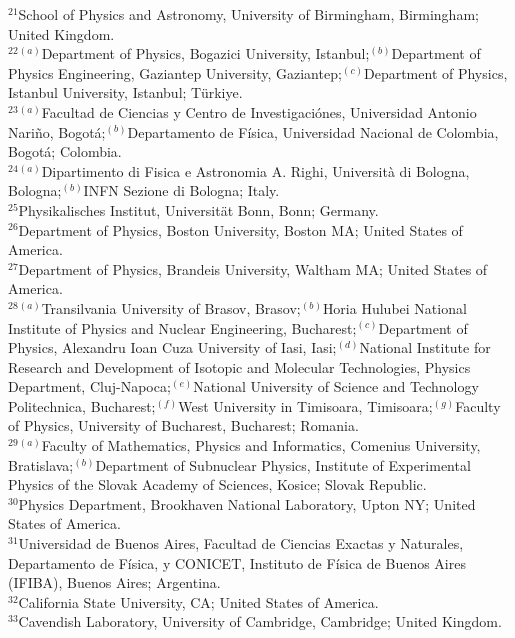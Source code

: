 \begin{flushleft}
$^{21}$School of Physics and Astronomy, University of Birmingham, Birmingham; United Kingdom.\\
$^{22}$$^{(a)}$Department of Physics, Bogazici University, Istanbul;$^{(b)}$Department of Physics Engineering, Gaziantep University, Gaziantep;$^{(c)}$Department of Physics, Istanbul University, Istanbul; T\"urkiye.\\
$^{23}$$^{(a)}$Facultad de Ciencias y Centro de Investigaci\'ones, Universidad Antonio Nari\~no, Bogot\'a;$^{(b)}$Departamento de F\'isica, Universidad Nacional de Colombia, Bogot\'a; Colombia.\\
$^{24}$$^{(a)}$Dipartimento di Fisica e Astronomia A. Righi, Università di Bologna, Bologna;$^{(b)}$INFN Sezione di Bologna; Italy.\\
$^{25}$Physikalisches Institut, Universit\"{a}t Bonn, Bonn; Germany.\\
$^{26}$Department of Physics, Boston University, Boston MA; United States of America.\\
$^{27}$Department of Physics, Brandeis University, Waltham MA; United States of America.\\
$^{28}$$^{(a)}$Transilvania University of Brasov, Brasov;$^{(b)}$Horia Hulubei National Institute of Physics and Nuclear Engineering, Bucharest;$^{(c)}$Department of Physics, Alexandru Ioan Cuza University of Iasi, Iasi;$^{(d)}$National Institute for Research and Development of Isotopic and Molecular Technologies, Physics Department, Cluj-Napoca;$^{(e)}$National University of Science and Technology Politechnica, Bucharest;$^{(f)}$West University in Timisoara, Timisoara;$^{(g)}$Faculty of Physics, University of Bucharest, Bucharest; Romania.\\
$^{29}$$^{(a)}$Faculty of Mathematics, Physics and Informatics, Comenius University, Bratislava;$^{(b)}$Department of Subnuclear Physics, Institute of Experimental Physics of the Slovak Academy of Sciences, Kosice; Slovak Republic.\\
$^{30}$Physics Department, Brookhaven National Laboratory, Upton NY; United States of America.\\
$^{31}$Universidad de Buenos Aires, Facultad de Ciencias Exactas y Naturales, Departamento de F\'isica, y CONICET, Instituto de Física de Buenos Aires (IFIBA), Buenos Aires; Argentina.\\
$^{32}$California State University, CA; United States of America.\\
$^{33}$Cavendish Laboratory, University of Cambridge, Cambridge; United Kingdom.\\
$$
\end{flushleft}
